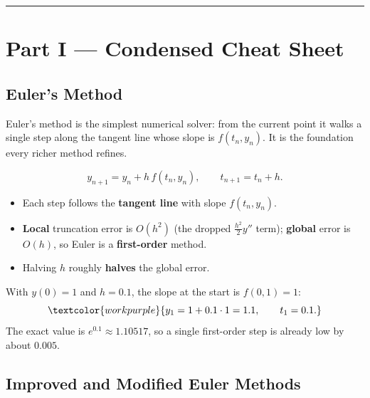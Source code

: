 \vspace{0.6em}
\hrule
\vspace{0.6em}

{}
\section*{Part I --- Condensed Cheat Sheet}
\setcounter{section}{5}   %

\subsection{Euler's Method}

Euler's method is the simplest numerical solver: from the current point it walks
a single step along the tangent line whose slope is $f(t_n,y_n)$. It is the
foundation every richer method refines.

\begin{formulabox}
\[ y_{n+1} = y_n + h\,f(t_n,y_n), \qquad t_{n+1} = t_n + h. \]
\begin{itemize}[leftmargin=1.4em, itemsep=2pt]
    \item Each step follows the \textbf{tangent line} with slope $f(t_n,y_n)$.
    \item \textbf{Local} truncation error is $O(h^{2})$ (the dropped
          $\tfrac{h^{2}}{2}y''$ term); \textbf{global} error is $O(h)$, so Euler
          is a \textbf{first-order} method.
    \item Halving $h$ roughly \textbf{halves} the global error.
\end{itemize}
\end{formulabox}

\begin{examplebox}[Worked Example 5.1: One Euler step for $y'=y$]
With $y(0)=1$ and $h=0.1$, the slope at the start is $f(0,1)=1$:
\[ \textcolor{workpurple}{y_1 = 1 + 0.1\cdot 1 = 1.1, \qquad t_1 = 0.1.} \]
The exact value is $e^{0.1}\approx 1.10517$, so a single first-order step is
already low by about $0.005$.
\end{examplebox}

\subsection{Improved and Modified Euler Methods}

